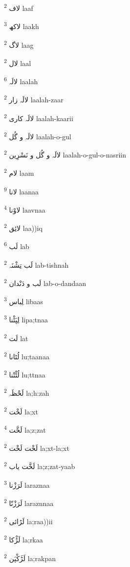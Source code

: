 \documentclass[12pt]{article}
\begin{document}
\begin{multicols}{5}
{\ur لاف}   \textsuperscript{2} laaf

{\ur لاکھ}   \textsuperscript{3} laakh

{\ur لاگ}   \textsuperscript{2} laag

{\ur لال}   \textsuperscript{2} laal

{\ur لالَہ}   \textsuperscript{6} laalah

{\ur لالَہ زار}   \textsuperscript{2} laalah-zaar

{\ur لالَہ کاری}   \textsuperscript{2} laalah-kaarii

{\ur لالَہ و گُل}   \textsuperscript{2} laalah-o-gul

{\ur لالَہ و گُل و نَسْرِین}   \textsuperscript{2} laalah-o-gul-o-nasriin

{\ur لام}   \textsuperscript{2} laam

{\ur لانا}   \textsuperscript{9} laanaa

{\ur لاوْنا}   \textsuperscript{4} laavnaa

{\ur لائِق}   \textsuperscript{2} laa))iq

{\ur لَب}   \textsuperscript{6} lab

{\ur لَب تِشْنَہ}   \textsuperscript{2} lab-tishnah

{\ur لَب و دَنْدان}   \textsuperscript{2} lab-o-dandaan

{\ur لِباس}   \textsuperscript{3} libaas

{\ur لِپَٹْنا}   \textsuperscript{3} lipa;tnaa

{\ur لَت}   \textsuperscript{2} lat

{\ur لُٹانا}   \textsuperscript{2} lu;taanaa

{\ur لُٹْتْنا}   \textsuperscript{2} lu;ttnaa

{\ur لَحْظَہ}   \textsuperscript{2} la;h:zah

{\ur لَخْت}   \textsuperscript{2} la;xt

{\ur لَخَّت}   \textsuperscript{4} la;z;zat

{\ur لَخْت لَخْت}   \textsuperscript{2} la;xt-la;xt

{\ur لَخَّت یاب}   \textsuperscript{2} la;z;zat-yaab

{\ur لَرَزْنا}   \textsuperscript{3} laraznaa

{\ur لَرَزْنّا}   \textsuperscript{2} laraznnaa

{\ur لَڑائی}   \textsuperscript{2} la;raa))ii

{\ur لَڑْکا}   \textsuperscript{2} la;rkaa

{\ur لَڑَکْپَن}   \textsuperscript{2} la;rakpan


\end{multicols}
\end{document}
